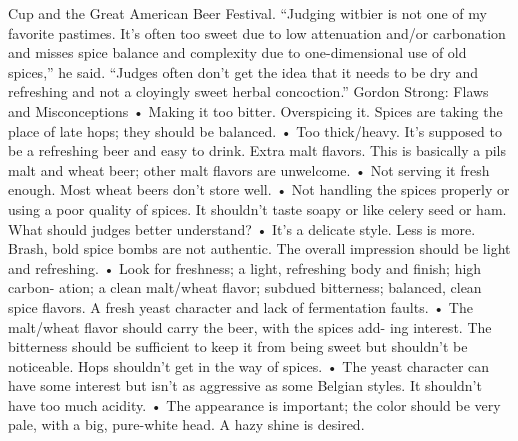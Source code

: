 \documentclass[a4paper,parskip=half]{scrartcl}
\begin{document}
Cup and the Great American Beer Festival. “Judging witbier is not one
of my favorite pastimes. It’s often too sweet due to low attenuation
and/or carbonation and misses spice balance and complexity due to
one-dimensional use of old spices,” he said. “Judges often don’t get the
idea that it needs to be dry and refreshing and not a cloyingly sweet
herbal concoction.”
Gordon Strong: Flaws and Misconceptions
• Making it too bitter. Overspicing it. Spices are taking the place of
late hops; they should be balanced.
• Too thick/heavy. It’s supposed to be a refreshing beer and easy to
drink. Extra malt flavors. This is basically a pils malt and wheat
beer; other malt flavors are unwelcome.
• Not serving it fresh enough. Most wheat beers don’t store well.
• Not handling the spices properly or using a poor quality of spices. It
shouldn’t taste soapy or like celery seed or ham.
What should judges better understand?
• It’s a delicate style. Less is more. Brash, bold spice bombs are not
authentic. The overall impression should be light and refreshing.
• Look for freshness; a light, refreshing body and finish; high carbon-
ation; a clean malt/wheat flavor; subdued bitterness; balanced, clean
spice flavors. A fresh yeast character and lack of fermentation faults.
• The malt/wheat flavor should carry the beer, with the spices add-
ing interest. The bitterness should be sufficient to keep it from
being sweet but shouldn’t be noticeable. Hops shouldn’t get in the
way of spices.
• The yeast character can have some interest but isn’t as aggressive as
some Belgian styles. It shouldn’t have too much acidity.
• The appearance is important; the color should be very pale, with a
big, pure-white head. A hazy shine is desired.
\end{document}
